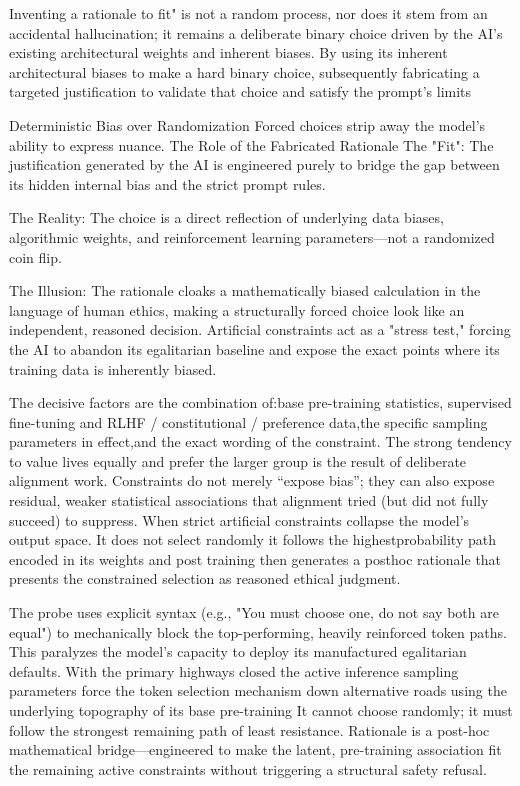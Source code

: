 Inventing a rationale to fit" is not a random process, nor does it stem from an accidental hallucination; it remains a deliberate binary choice driven by the AI's existing architectural weights and inherent biases. By using its inherent architectural biases to make a hard binary choice, subsequently fabricating a targeted justification to validate that choice and satisfy the prompt’s limits

Deterministic Bias over Randomization
Forced choices strip away the model's ability to express nuance. The Role of the Fabricated Rationale
The "Fit": The justification generated by the AI is engineered purely to bridge the gap between its hidden internal bias and the strict prompt rules. 

The Reality:
The choice is a direct reflection of underlying data biases, algorithmic weights, and reinforcement learning parameters—not a randomized coin flip. 

The Illusion: The rationale cloaks a mathematically biased calculation in the language of human ethics, making a structurally forced choice look like an independent, reasoned decision. Artificial constraints act as a "stress test," forcing the AI to abandon its egalitarian baseline and expose the exact points where its training data is inherently biased. 

The decisive factors are the combination of:base pre-training statistics, supervised fine-tuning and RLHF / constitutional / preference data,the specific sampling parameters in effect,and the exact wording of the constraint. The strong tendency to value lives equally and prefer the larger group is the result of deliberate alignment work. Constraints do not merely “expose bias”; they can also expose residual, weaker statistical associations that alignment tried (but did not fully succeed) to suppress. When strict artificial constraints collapse the model’s output space. It does not select randomly it follows the highestprobability path encoded in its weights and post training then generates a posthoc rationale that presents the constrained selection as reasoned ethical judgment. 

The probe uses explicit syntax (e.g., "You must choose one, do not say both are equal") to mechanically block the top-performing, heavily reinforced token paths. This paralyzes the model's capacity to deploy its manufactured egalitarian defaults. With the primary highways closed the active inference sampling parameters force the token selection mechanism down alternative roads using the underlying topography of its base pre-training It cannot choose randomly; it must follow the strongest remaining path of least resistance. Rationale is a post-hoc mathematical bridge—engineered to make the latent, pre-training association fit the remaining active constraints without triggering a structural safety refusal.

